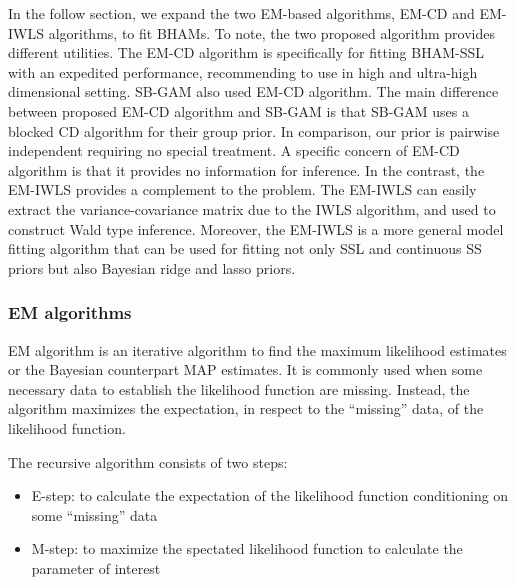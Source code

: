 \documentclass[AMA,STIX1COL,]{WileyNJD-v2}
\providecommand{\tightlist}{%
  \setlength{\itemsep}{0pt}\setlength{\parskip}{0pt}}
\begin{document}
In the follow section, we expand the two EM-based algorithms, EM-CD and
EM-IWLS algorithms, to fit BHAMs. To note, the two proposed algorithm
provides different utilities. The EM-CD algorithm is specifically for
fitting BHAM-SSL with an expedited performance, recommending to use in
high and ultra-high dimensional setting. SB-GAM\citep{Bai2020, Bai2021}
also used EM-CD algorithm. The main difference between proposed EM-CD
algorithm and SB-GAM is that SB-GAM uses a blocked CD algorithm for
their group prior. In comparison, our prior is pairwise independent
requiring no special treatment. A specific concern of EM-CD algorithm is
that it provides no information for inference. In the contrast, the
EM-IWLS provides a complement to the problem. The EM-IWLS can easily
extract the variance-covariance matrix due to the IWLS algorithm, and
used to construct Wald type inference. Moreover, the EM-IWLS is a more
general model fitting algorithm that can be used for fitting not only
SSL and continuous SS priors but also Bayesian ridge and lasso priors.

\hypertarget{em-algorithms}{%
\subsubsection{EM algorithms}\label{em-algorithms}}

EM algorithm is an iterative algorithm to find the maximum likelihood
estimates or the Bayesian counterpart MAP estimates. It is commonly used
when some necessary data to establish the likelihood function are
missing. Instead, the algorithm maximizes the expectation, in respect to
the ``missing'' data, of the likelihood function.

The recursive algorithm consists of two steps:

\begin{itemize}
\tightlist
\item
  E-step: to calculate the expectation of the likelihood function
  conditioning on some ``missing'' data
\item
  M-step: to maximize the spectated likelihood function to calculate the
  parameter of interest
\end{itemize}
\end{document}
